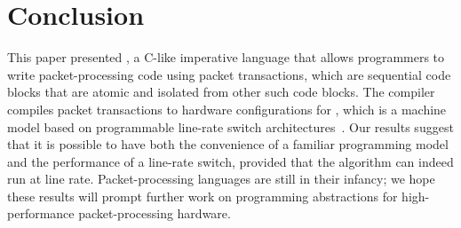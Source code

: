 \section{Conclusion}
\label{s:conclusion}
This paper presented \pktlanguage, a C-like imperative language that allows
programmers to write packet-processing code using packet transactions, which
are sequential code blocks that are atomic and isolated from other such code
blocks. The \pktlanguage compiler compiles packet transactions to hardware
configurations for \absmachine, which is a machine model based on programmable line-rate switch
architectures~\cite{flexpipe, xpliant, tofino}. Our results suggest that it is
possible to have both the convenience of a familiar programming model and the
performance of a line-rate switch, provided that the algorithm can indeed run
at line rate.  Packet-processing languages are still in their infancy; we hope
these results will prompt further work on programming abstractions for
high-performance packet-processing hardware.
